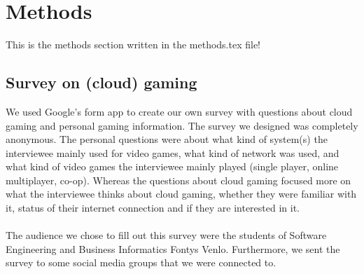 \section{Methods}
This is the methods section written in the methods.tex file!

\subsection{Survey on (cloud) gaming}
We used Google's form app to create our own survey with questions about cloud gaming and personal gaming information. The survey we designed was completely anonymous. The personal questions were about what kind of system(s) the interviewee mainly used for video games, what kind of network was used, and what kind of video games the interviewee mainly played (single player, online multiplayer, co-op). Whereas the questions about cloud gaming focused more on what the interviewee thinks about cloud gaming, whether they were familiar with it, status of their internet connection and if they are interested in it.
\\\\
The audience we chose to fill out this survey were the students of Software Engineering and Business Informatics Fontys Venlo. Furthermore, we sent the survey to some social media groups that we were connected to.